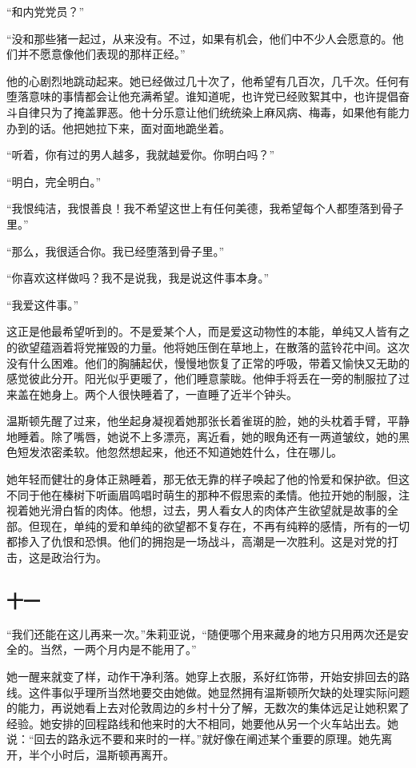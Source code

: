 ``和内党党员？''

``没和那些猪一起过，从来没有。不过，如果有机会，他们中不少人会愿意的。他们并不愿意像他们表现的那样正经。''

他的心剧烈地跳动起来。她已经做过几十次了，他希望有几百次，几千次。任何有堕落意味的事情都会让他充满希望。谁知道呢，也许党已经败絮其中，也许提倡奋斗自律只为了掩盖罪恶。他十分乐意让他们统统染上麻风病、梅毒，如果他有能力办到的话。他把她拉下来，面对面地跪坐着。

``听着，你有过的男人越多，我就越爱你。你明白吗？''

``明白，完全明白。''

``我恨纯洁，我恨善良！我不希望这世上有任何美德，我希望每个人都堕落到骨子里。''

``那么，我很适合你。我已经堕落到骨子里。''

``你喜欢这样做吗？我不是说我，我是说这件事本身。''

``我爱这件事。''

这正是他最希望听到的。不是爱某个人，而是爱这动物性的本能，单纯又人皆有之的欲望蕴涵着将党摧毁的力量。他将她压倒在草地上，在散落的蓝铃花中间。这次没有什么困难。他们的胸脯起伏，慢慢地恢复了正常的呼吸，带着又愉快又无助的感觉彼此分开。阳光似乎更暖了，他们睡意蒙眬。他伸手将丢在一旁的制服拉了过来盖在她身上。两个人很快睡着了，一直睡了近半个钟头。

温斯顿先醒了过来，他坐起身凝视着她那张长着雀斑的脸，她的头枕着手臂，平静地睡着。除了嘴唇，她说不上多漂亮，离近看，她的眼角还有一两道皱纹，她的黑色短发浓密柔软。他忽然想起来，他还不知道她姓什么，住在哪儿。

她年轻而健壮的身体正熟睡着，那无依无靠的样子唤起了他的怜爱和保护欲。但这不同于他在榛树下听画眉鸣唱时萌生的那种不假思索的柔情。他拉开她的制服，注视着她光滑白皙的肉体。他想，过去，男人看女人的肉体产生欲望就是故事的全部。但现在，单纯的爱和单纯的欲望都不复存在，不再有纯粹的感情，所有的一切都掺入了仇恨和恐惧。他们的拥抱是一场战斗，高潮是一次胜利。这是对党的打击，这是政治行为。

\subsection{十一}\label{ux5341ux4e00}

``我们还能在这儿再来一次。''朱莉亚说，``随便哪个用来藏身的地方只用两次还是安全的。当然，一两个月内是不能用了。''

她一醒来就变了样，动作干净利落。她穿上衣服，系好红饰带，开始安排回去的路线。这件事似乎理所当然地要交由她做。她显然拥有温斯顿所欠缺的处理实际问题的能力，再说她看上去对伦敦周边的乡村十分了解，无数次的集体远足让她积累了经验。她安排的回程路线和他来时的大不相同，她要他从另一个火车站出去。她说：``回去的路永远不要和来时的一样。''就好像在阐述某个重要的原理。她先离开，半个小时后，温斯顿再离开。

